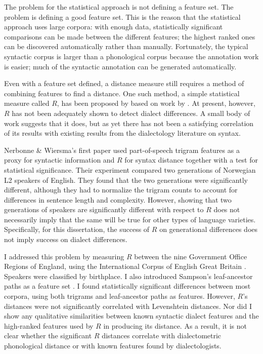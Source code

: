 The problem for the statistical approach is not defining a feature
set. The problem is defining a good feature set. This is the reason
that the statistical approach uses large corpora: with enough data,
statistically significant comparisons can be made between the
different features; the highest ranked ones can be discovered
automatically rather than manually.  Fortunately, the typical syntactic corpus
is larger than a phonological corpus because the annotation
work is easier; much of the syntactic annotation can be generated
automatically.

Even with a feature set defined, a distance measure still requires a
method of combining features to find a distance. One such method, a
simple statistical measure called $R$, has been proposed by
 based on work by . At
present, however, $R$ has not been adequately shown to detect dialect
differences. A small body of work suggests that it does, but as yet
there has not been a satisfying correlation of its results with
existing results from the dialectology literature on syntax.

Nerbonne \& Wiersma's first paper used part-of-speech trigram features
as a proxy for syntactic information and $R$ for syntax distance
together with a test for statistical significance\cite{nerbonne06}.
Their experiment compared two generations of Norwegian L2 speakers of
English.  They found that the two generations were significantly
different, although they had to normalize the trigram counts to
account for differences in sentence length and complexity. However,
showing that two generations of speakers are significantly different
with respect to $R$ does not necessarily imply that the same will be
true for other types of language varieties. Specifically, for this
dissertation, the success of $R$ on generational differences does not
imply success on dialect differences.

I addressed this problem \cite{sanders08b} by measuring $R$ between
the nine Government Office Regions of England, using the International
Corpus of English Great Britain \cite{nelson02}. Speakers were classified by
birthplace. I also introduced Sampson's leaf-ancestor paths as
a feature set \cite{sampson00}. I found statistically
significant differences between most corpora, using both trigrams and
leaf-ancestor paths as features. However, $R$'s distances were not
significantly correlated with Levenshtein distances. Nor did I
show any qualitative similarities between known syntactic dialect
features and the high-ranked features used by $R$ in producing its
distance. As a result, it is not clear whether the significant $R$ distances
correlate with dialectometric phonological distance or with known
features found by dialectologists.

